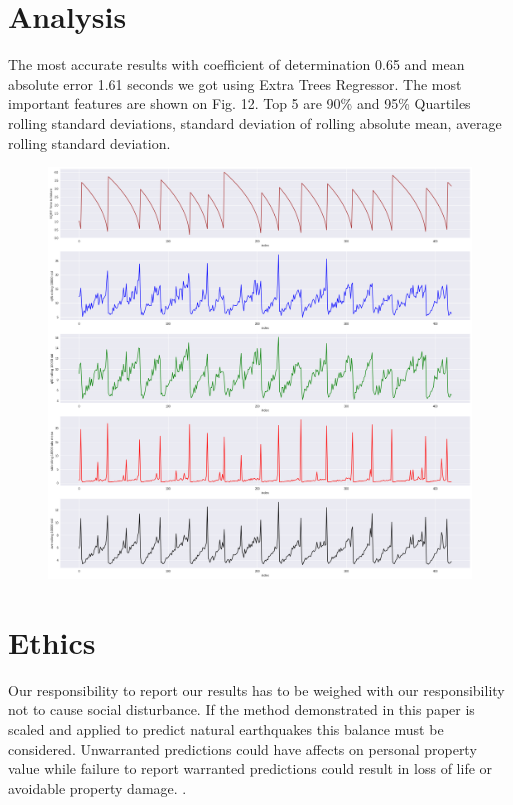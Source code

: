 \documentclass[]{llncs} %
\begin{document}
\section{Analysis}

The most accurate results with coefficient of determination 0.65 and mean absolute error 1.61 seconds we got using Extra Trees Regressor. The most important features are shown on Fig. 12. Top 5 are 90\% and 95\% Quartiles rolling standard deviations, standard deviation of rolling absolute mean, average rolling standard deviation.
\begin{figure}[h!]
	\centering
	\includegraphics[width=01\linewidth]{analysis}
	\caption{}
	\label{fig:analysis}
\end{figure}


\section{Ethics}

Our responsibility to report our results has to be weighed with our responsibility not to cause social disturbance. If the method demonstrated in this paper is scaled and applied to predict natural earthquakes this balance must be considered. Unwarranted predictions could have affects on personal property value while failure to report warranted predictions could result in loss of life or avoidable property damage. \cite{Ayhan}. \par
\end{document}
